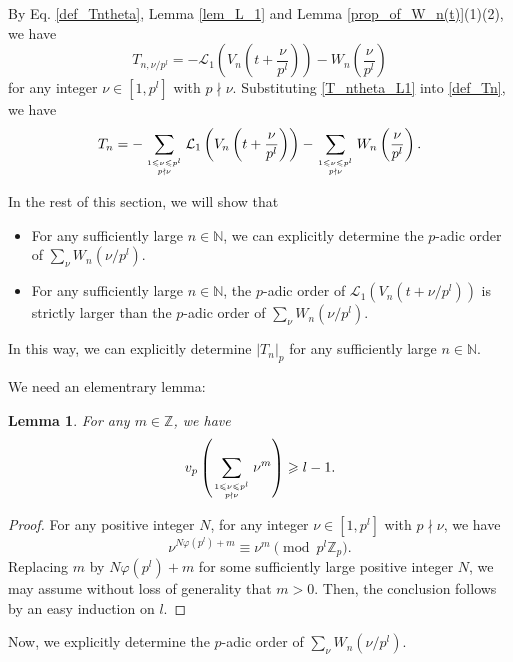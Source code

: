 \documentclass[12pt]{article}
\newtheorem{lemma}[theorem]{Lemma}
\numberwithin{equation}{section}
\begin{document}
By Eq. \eqref{def_Tntheta}, Lemma \ref{lem_L_1} and Lemma \ref{prop_of_W_n(t)}(1)(2), we have
\begin{equation}\label{T_ntheta_L1}
T_{n,\nu/p^l} = - \mathcal{L}_1\left( V_n\left(t+\frac{\nu}{p^l}\right) \right) - W_n\left( \frac{\nu}{p^l} \right)
\end{equation}
for any integer $\nu \in [1,p^l]$ with $p \nmid \nu$. Substituting \eqref{T_ntheta_L1} into \eqref{def_Tn}, we have
\begin{equation}\label{T_n_L1}
T_n = -\sum_{1 \leqslant \nu \leqslant p^l \atop p \nmid \nu}  \mathcal{L}_1\left( V_n\left(t+\frac{\nu}{p^l}\right) \right) - \sum_{1 \leqslant \nu \leqslant p^l \atop p \nmid \nu} W_n\left( \frac{\nu}{p^l} \right).
\end{equation}

In the rest of this section, we will show that
\begin{itemize}
	\item For any sufficiently large $n \in \mathbb{N}$, we can explicitly determine the $p$-adic order of $\sum_{\nu} W_n(\nu/p^l)$.
	\item For any sufficiently large $n \in \mathbb{N}$,  the $p$-adic order of $\mathcal{L}_1\left( V_n\left(t+\nu/p^l\right) \right)$ is strictly larger than the $p$-adic order of $\sum_{\nu} W_n(\nu/p^l)$.
\end{itemize}
In this way, we can explicitly determine $|T_n|_p$ for any sufficiently large $n \in \mathbb{N}$. 


\bigskip

We need an elementrary lemma: 
\begin{lemma}\label{elementrary_lemma}
For any $m \in \mathbb{Z}$, we have
\[ v_p\left( \sum_{1 \leqslant \nu \leqslant p^l \atop p \nmid \nu} \nu^{m} \right) \geqslant l-1. \]
\end{lemma}
\begin{proof}
For any positive integer $N$, for any integer $\nu \in[1,p^l]$ with $p \nmid \nu$, we have
\[ \nu^{N\varphi(p^l)+m} \equiv \nu^{m} \pmod{p^{l}\mathbb{Z}_p}. \]
Replacing $m$ by $N\varphi(p^l)+m$ for some sufficiently large positive integer $N$, we may assume without loss of generality that $m > 0$. Then, the conclusion follows by an easy induction on $l$. 
\end{proof}

Now, we explicitly determine the $p$-adic order of $\sum_{\nu} W_n(\nu/p^l)$.
\end{document}
